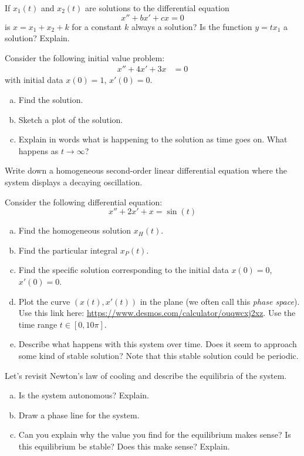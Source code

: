 \begin{problem}
If $x_1(t)$ and $x_2(t)$ are solutions to the differential equation
\[
x'' + bx' +cx = 0
\]
is $x=x_1+x_2+k$ for a constant $k$ always a solution? Is the function $y=tx_1$ a solution? Explain.
\end{problem}


\begin{problem}
Consider the following initial value problem:
\begin{align*}
    x''+4x'+3x&=0
\end{align*}
with initial data $x(0)=1$, $x'(0)=0$.
\begin{enumerate}[(a)]
    \item Find the solution.
    \item Sketch a plot of the solution.
    \item Explain in words what is happening to the solution as time goes on. What happens as $t\to \infty$?
\end{enumerate}
\end{problem}

\begin{problem}
Write down a homogeneous second-order linear differential equation where the system displays a decaying oscillation.
\end{problem}

\begin{problem}
Consider the following differential equation:
\[
x''+2x'+x=\sin(t)
\]
\begin{enumerate}[(a)]
    \item Find the homogeneous solution $x_H(t)$.
    \item Find the particular integral $x_P(t)$.
    \item Find the specific solution corresponding to the initial data $x(0)=0$, $x'(0)=0$.
    \item Plot the curve $(x(t),x'(t))$ in the plane (we often call this \emph{phase space}). Use this link here: \url{https://www.desmos.com/calculator/ouqwcxj2xz}. Use the time range $t\in [0,10\pi]$.
    \item Describe what happens with this system over time. Does it seem to approach some kind of stable solution? Note that this stable solution could be periodic.
\end{enumerate}
\end{problem}

\begin{problem}
    Let's revisit Newton's law of cooling and describe the equilibria of the system.
\begin{enumerate}[(a)]
    \item Is the system autonomous? Explain.
    \item Draw a phase line for the system.
    \item Can you explain why the value you find for the equilibrium makes sense? Is this equilibrium be stable? Does this make sense? Explain.
\end{enumerate}
\end{problem}

